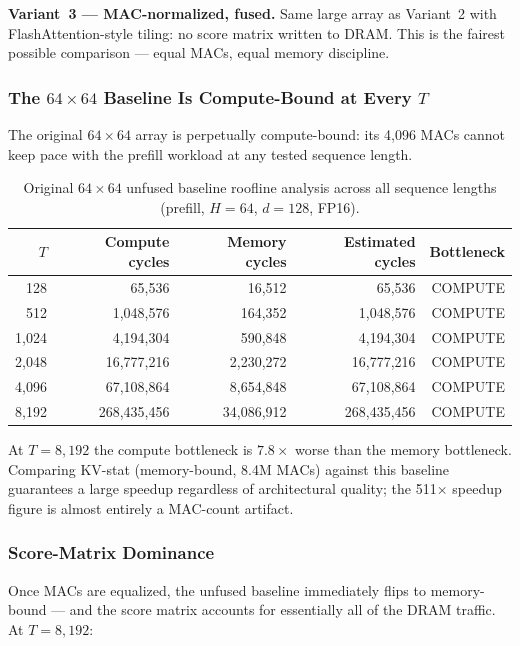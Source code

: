\documentclass[11pt]{article}
\begin{document}
\textbf{Variant~3 --- MAC-normalized, fused.}
Same large array as Variant~2 with FlashAttention-style tiling:
no score matrix written to DRAM.
This is the fairest possible comparison --- equal MACs,
equal memory discipline.

\subsubsection*{The \(64 \times 64\) Baseline Is Compute-Bound at Every \(T\)}

The original \(64 \times 64\) array is perpetually compute-bound:
its 4,096 MACs cannot keep pace with the prefill workload at any
tested sequence length.

\begin{table}[H]
\centering
\caption{Original \(64 \times 64\) unfused baseline roofline analysis
across all sequence lengths (prefill, \(H=64\), \(d=128\), FP16).}
\label{tab:baseline_orig}
\begin{tabular}{rrrrr}
\toprule
\(T\) & Compute cycles & Memory cycles & Estimated cycles & Bottleneck \\
\midrule
128   &      65,536 &      16,512 &      65,536 & COMPUTE \\
512   &   1,048,576 &     164,352 &   1,048,576 & COMPUTE \\
1,024 &   4,194,304 &     590,848 &   4,194,304 & COMPUTE \\
2,048 &  16,777,216 &   2,230,272 &  16,777,216 & COMPUTE \\
4,096 &  67,108,864 &   8,654,848 &  67,108,864 & COMPUTE \\
8,192 & 268,435,456 &  34,086,912 & 268,435,456 & COMPUTE \\
\bottomrule
\end{tabular}
\end{table}

At \(T = 8{,}192\) the compute bottleneck is \(7.8\times\) worse
than the memory bottleneck.
Comparing KV-stat (memory-bound, 8.4M MACs) against this baseline
guarantees a large speedup regardless of architectural quality;
the 511$\times$ speedup figure is almost entirely a MAC-count artifact.

\subsubsection*{Score-Matrix Dominance}

Once MACs are equalized, the unfused baseline immediately flips
to memory-bound --- and the score matrix accounts for essentially
all of the DRAM traffic.
At \(T = 8{,}192\):
\end{document}
